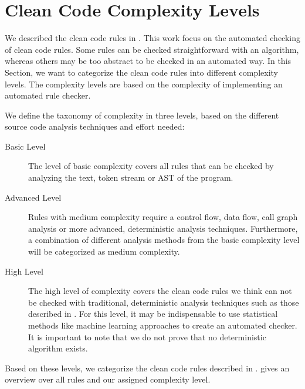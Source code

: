 \section{Clean Code Complexity Levels}\label{sec:cc_complexity_levels}
We described the clean code rules in . This work focus on the automated checking of clean code rules. Some rules can be checked straightforward with an algorithm, whereas others may be too abstract to be checked in an automated way. In this Section, we want to categorize the clean code rules into different complexity levels. The complexity levels are based on the complexity of implementing an automated rule checker. 

We define the taxonomy of complexity in three levels, based on the different source code analysis techniques and effort needed:
\begin{description}
    \item[Basic Level] The level of basic complexity covers all rules that can be checked by analyzing the text, token stream or AST of the program.
    \item[Advanced Level] Rules with medium complexity require a control flow, data flow, call graph analysis or more advanced, deterministic analysis techniques. Furthermore, a combination of different analysis methods from the basic complexity level will be categorized as medium complexity. 
    \item[High Level] The high level of complexity covers the clean code rules we think can not be checked with traditional, deterministic analysis techniques such as those described in . For this level, it may be indispensable to use statistical methods like machine learning approaches to create an automated checker. It is important to note that we do not prove that no deterministic algorithm exists. 
\end{description}

Based on these levels, we categorize the clean code rules described in .  gives an overview over all rules and our assigned complexity level.


